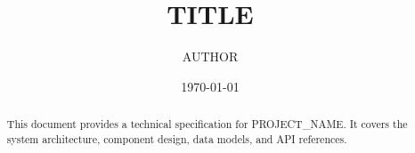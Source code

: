 \documentclass[12pt,letterpaper]{article}
\title{{{TITLE}}}
\author{{{AUTHOR}}}
\date{\today}
\begin{document}
\maketitle

\begin{abstract}
This document provides a technical specification for {{PROJECT_NAME}}.
It covers the system architecture, component design, data models, and API references.
\end{abstract}

\tableofcontents
\newpage








\end{document}
